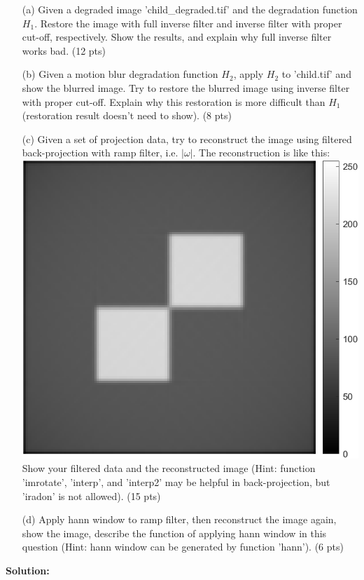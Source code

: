 \documentclass[11pt,letterpaper]{article}
\begin{document}
\begin{itemize}
\item[(a)] Given a degraded image 'child\_degraded.tif' and the degradation function $H_1$. Restore the image with full inverse filter and inverse filter with proper cut-off, respectively. Show the results, and explain why full inverse filter works bad. (12 pts)
\item[(b)] Given a motion blur degradation function $H_2$, 
apply $H_2$ to 'child.tif' and show the blurred image. Try to restore the blurred image using inverse filter with proper cut-off. Explain why this restoration is more difficult than $H_1$  (restoration result doesn't need to show). (8 pts)



\item[(c)] Given a set of projection data, try to reconstruct the image using filtered back-projection with ramp filter, i.e. $|\omega|$. The reconstruction is like this:\\
\includegraphics[width=0.3\linewidth]{rec.png}\\
Show your filtered data and the reconstructed image (Hint: function 'imrotate', 'interp', and 'interp2' may be helpful in back-projection, but 'iradon' is not allowed). (15 pts)
\item[(d)] Apply hann window to ramp filter, then reconstruct the image again, show the image, describe the function of applying hann window in this question (Hint: hann window can be generated by function 'hann'). (6 pts)

\end{itemize}
\textbf{Solution:}
\end{document}
